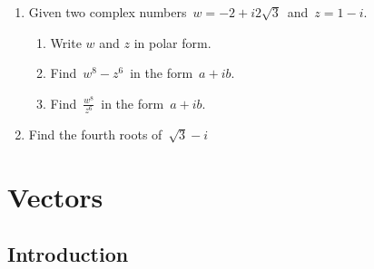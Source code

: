 \documentclass[11pt,a4paper]{article}
\theoremstyle{definition}
\begin{document}
\begin{enumerate}
\item Given two complex numbers $\, w = -2 + i2\sqrt{3}\,$ and $\, z = 1 - i$.
\begin{enumerate}
      \item Write $w$ and $z$ in polar form.
      
      \item Find  $\, w^8  - z^6\,$ in the form $\, a + i b$.
      
      \item Find $\,\frac{w^8}{z^6}\,$ in the form $\, a + i b$.\\
\end{enumerate}


\item Find the fourth roots of $\,\sqrt{3} - i$
\end{enumerate}









\pagebreak

\section{Vectors}

\subsection{Introduction}
\end{document}
